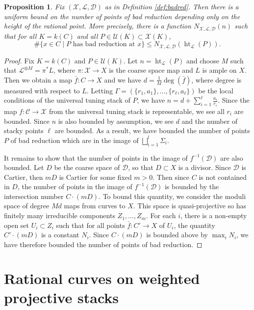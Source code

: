 \documentclass[a4paper,12pt]{amsart}
\newtheorem{prop}[thm]{Proposition}
\theoremstyle{definition}
\newcommand{\cX}{\mathcal{X}}
\newcommand{\cU}{\mathcal{U}}
\newcommand{\cC}{\mathcal{C}}
\newcommand{\cD}{\mathcal{D}}
\newcommand{\cL}{\mathcal{L}}
\DeclareMathOperator{\height}{ht}
\begin{document}
	\begin{prop}
		Fix $(\cX, \cL, \cD)$ as in Definition \ref{def:badred}. Then there is a uniform bound on the number of points of bad reduction depending only on the height of the rational point. More precisely, there is a function $N_{\cX, \cL, \cD}(n)$ such that for all $K=k(C)$ and all $P \in \cU(K) \subset \cX(K)$,
		$$
		\#\{x \in C \mid P \text{ has bad reduction at }x\} \le N_{\cX, \cL, \cD}(\height_{\cL}(P)). 
		$$
	\end{prop}
	\begin{proof}
		Fix $K=k(C)$ and $P\in\cU(K)$. Let $n=\height_{\cL}(P)$ and choose $M$ such that $\cL^{\otimes M}=\pi^*L$, where $\pi\colon\cX\to X$ is the coarse space map and $L$ is ample on $X$. Then we obtain a map $\bar{f}\colon C\to X$ and we have $d=\frac{1}{M}\deg(\bar{f})$, where degree is measured with respect to $L$. Letting $\Gamma=(\{r_1,a_1\},\dots,\{r_\ell,a_\ell\})$ be the local conditions of the universal tuning stack of $P$, we have $n = d + \sum_{i = 1}^\ell \frac{a_i}{r_i}$. Since the map $f\colon\cC\to\cX$ from the universal tuning stack is representable, we see all $r_i$ are bounded. Since $n$ is also bounded by assumption, we see $d$ and the number of stacky points $\ell$ are bounded. As a result, we have bounded the number of points $P$ of bad reduction which are in the image of $\bigsqcup_{i = 1}^l \Sigma_i$.
		
		It remains to show that the number of points in the image of $f^{-1}(\cD)$ are also bounded. Let $D$ be the coarse space of $\cD$, so that $D\subset X$ is a divisor. Since $\cD$ is Cartier, then $mD$ is Cartier for some fixed $m > 0$. Then since $C$ is not contained in $D$, the number of points in the image of $f^{-1}(\cD)$ is bounded by the intersection number $C\cdot (mD)$. To bound this quantity, we consider the moduli space of degree $Md$ maps from curves to $X$. This space is quasi-projective so has finitely many irreducible components $Z_1,\dots,Z_m$. For each $i$, there is a non-empty open set $U_i\subset Z_i$ such that for all points $\bar{f}\colon C'\to X$ of $U_i$, the quantity $C'\cdot (mD)$ is a constant $N_i$. Since $C\cdot (mD)$ is bounded above by $\max_i N_i$, we have therefore bounded the number of points of bad reduction.
	\end{proof}
	
	
	\section{Rational curves on weighted projective stacks}\label{sec:ex}\label{sec:ex:P1}
	
\end{document}
